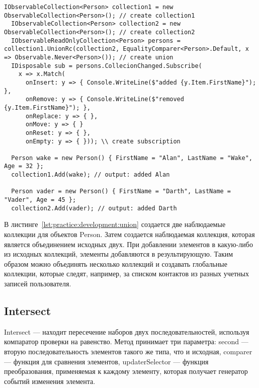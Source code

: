 \begin{lstlisting}[style=csharpinlinestyle, caption={Пример использования Union}, label=lst:practice:development:union]
  IObservableCollection<Person> collection1 = new ObservableCollection<Person>(); // create collection1
  IObservableCollection<Person> collection2 = new ObservableCollection<Person>(); // create collection2
  IObservableReadOnlyCollection<Person> persons = collection1.UnionRc(collection2, EqualityComparer<Person>.Default, x => Observable.Never<Person>()); // create union
  IDisposable sub = persons.CollecionChanged.Subscribe(
    x => x.Match(
      onInsert: y => { Console.WriteLine($"added {y.Item.FirstName}"); },
      onRemove: y => { Console.WriteLine($"removed {y.Item.FirstName}"); },
      onReplace: y => { },
      onMove: y => { }
      onReset: y => { },
      onEmpty: y => { })); \\ create subscription

  Person wake = new Person() { FirstName = "Alan", LastName = "Wake", Age = 32 };
  collection1.Add(wake); // output: added Alan

  Person vader = new Person() { FirstName = "Darth", LastName = "Vader", Age = 45 };
  collection2.Add(vader); // output: added Darth
\end{lstlisting}

В листинге~\ref{lst:practice:development:union} создается две наблюдаемые коллекции для объектов Person. Затем создается наблюдаемая коллекция, которая является объединением исходных двух.
При добавлении элементов в какую-либо из исходных коллекций, элементы добавляются в результирующую. Таким образом можно объединять несколько коллекций и создавать глобальные коллекции,
которые следят, например, за списком контактов из разных учетных записей пользователя.

\subsection{Intersect}
\label{sub:development:intersect}

Intersect --- находит пересечение наборов двух последовательностей, используя компаратор проверки на равенство.
Метод принимает три параметра: second --- вторую последовательность элементов такого же типа, что и исходная,
comparer --- функция для сравнения элементов, updaterSelector --- функция преобразования, применяемая к каждому элементу, которая получает генератор событий изменения элемента.

